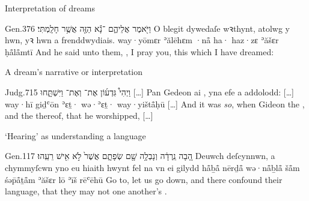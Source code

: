 \begin{frame}{\ex Interpretation of dreams}
	\begin{example}{Gen.}{37}{6}{}{}
		\quoling
		{וַיֹּ֖אמֶר אֲלֵיהֶ֑ם ־נָ֕א  הַזֶּ֖ה אֲשֶׁ֥ר חָלָֽמְתִּי׃}
		{O blegit dywedaſe wꝛthynt,  atolwg y  hwn, yꝛ hwn a frenddwydiais.}
		{way·yōmɛr ʾălēhɛm ·nå̄ ha· haz·zɛ ʾăšɛr ḥå̄lå̄mtī}
		{And he said unto them, , I pray you, this  which I have dreamed:}
	\end{example}
\end{frame}


\begin{frame}{\ex A dream’s narrative or interpretation}
	\begin{example}{Judg.}{7}{15}{}{}
		\quoling
		{וַיְהִי֩  גִּדְע֜וֹן אֶת־ וְאֶת־ וַיִּשְׁתָּ֑חוּ […]}%
		{Pan  Gedeon  ai , yna efe a addolodd: […]} %
		{way·hī  giḏʿōn ʾɛṯ· wə·ʾɛṯ· way·yištå̄ḥū […]}%
		{And it was \textit{so}, when Gideon  the , and the  thereof, that he worshipped, […]}%
	\end{example}
\end{frame}


\begin{frame}{\ex ‘Hearing’ as understanding a language}
	\begin{example}{Gen.}{11}{7}{}{}
		\quoling
		{הָ֚בָה נֵֽרְדָ֔ה וְנָבְלָ֥ה שָׁ֖ם שְׂפָתָ֑ם אֲשֶׁר֙ לֹ֣א  אִ֖ישׁ  רֵעֵֽהוּ׃}
		{Deuwch deſcynnwn, a chymmyſcwn yno eu hiaith hwynt fel na  vn  ei gilydd}
		{hå̄ḇå̄ nērḏå̄ wə·nå̄ḇlå̄ šå̄m śəp̄å̄ṯå̄m ʾăšɛr lō  ʾīš  rēʿēhū}
		{Go to, let us go down, and there confound their language, that they may not  one another’s .}
	\end{example}
\end{frame}


